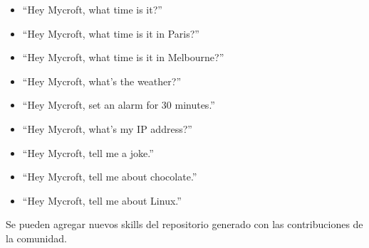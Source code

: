 \begin{itemize}

\item ``Hey Mycroft, what time is it?''

\item ``Hey Mycroft, what time is it in Paris?''

\item ``Hey Mycroft, what time is it in Melbourne?''

\item ``Hey Mycroft, what's the weather?''

\item ``Hey Mycroft, set an alarm for 30 minutes.''

\item ``Hey Mycroft, what's my IP address?''

\item ``Hey Mycroft, tell me a joke.''

\item ``Hey Mycroft, tell me about chocolate.''

\item ``Hey Mycroft, tell me about Linux.''

\end{itemize}

Se pueden agregar nuevos skills del repositorio generado con las contribuciones de la comunidad.~\cite{MycrofSkills}
